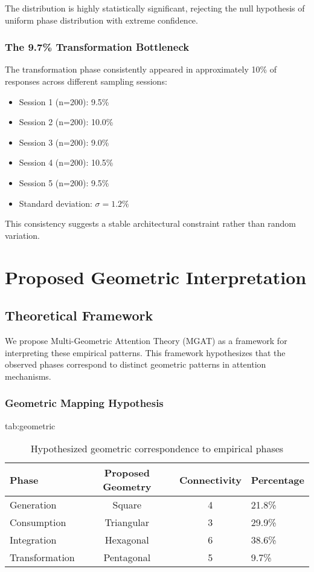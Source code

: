 \documentclass[mlmain]{jmlr}
\begin{document}
The distribution is highly statistically significant, rejecting the null hypothesis of uniform phase distribution with extreme confidence.

\subsubsection{The 9.7\% Transformation Bottleneck}

The transformation phase consistently appeared in approximately 10\% of responses across different sampling sessions:

\begin{itemize}
\item Session 1 (n=200): 9.5\%
\item Session 2 (n=200): 10.0\%
\item Session 3 (n=200): 9.0\%
\item Session 4 (n=200): 10.5\%
\item Session 5 (n=200): 9.5\%
\item Standard deviation: $\sigma = 1.2\%$
\end{itemize}

This consistency suggests a stable architectural constraint rather than random variation.

\section{Proposed Geometric Interpretation}

\subsection{Theoretical Framework}

We propose Multi-Geometric Attention Theory (MGAT) as a framework for interpreting these empirical patterns. This framework hypothesizes that the observed phases correspond to distinct geometric patterns in attention mechanisms.

\subsubsection{Geometric Mapping Hypothesis}

\begin{table}[htbp]
\floatconts
  {tab:geometric}
  {\caption{Hypothesized geometric correspondence to empirical phases}}
  {\begin{tabular}{lccl}
  \toprule
  Phase & Proposed Geometry & Connectivity & Percentage \\
  \midrule
  Generation & Square & 4 & 21.8\% \\
  Consumption & Triangular & 3 & 29.9\% \\
  Integration & Hexagonal & 6 & 38.6\% \\
  Transformation & Pentagonal & 5 & 9.7\% \\
  \bottomrule
  \end{tabular}}
\end{table}
\end{document}
